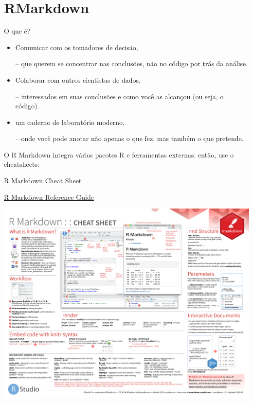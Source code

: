 \documentclass[
  9pt,
  ignorenonframetext,
]{beamer}
\begin{document}
\hypertarget{rmarkdown}{%
\section{RMarkdown}\label{rmarkdown}}

\begin{frame}{O que é?}
\protect\hypertarget{o-que-uxe9}{}
\begin{itemize}
\item
  Comunicar com os tomadores de decisão,

  -- que querem se concentrar nas conclusões, não no código por trás da
  análise.
\item
  Colaborar com outros cientistas de dados,

  -- interessados em suas conclusões e como você as alcançou (ou seja, o
  código).
\item
  um caderno de laboratório moderno,

  -- onde você pode anotar não apenas o que fez, mas também o que
  pretende.
\end{itemize}

O R Markdown integra vários pacotes R e ferramentas externas. então, use
o cheatsheets:

\href{https://github.com/rstudio/cheatsheets/raw/master/rmarkdown-2.0.pdf}{R
Markdown Cheat Sheet}

\href{https://www.rstudio.com/wp-content/uploads/2015/03/rmarkdown-reference.pdf}{R
Markdown Reference Guide}
\end{frame}

\begin{frame}{}
\protect\hypertarget{section-1}{}
\includegraphics{imgs/rmarkdown}
\end{frame}
\end{document}
